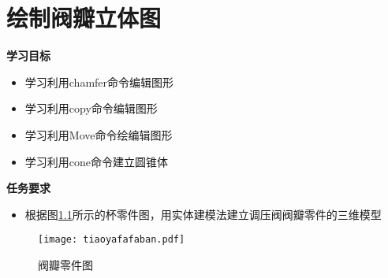 \chapter{绘制阀瓣立体图}

{\bfseries 学习目标}
\begin{itemize}
\item 学习利用chamfer命令编辑图形
\item 学习利用copy命令编辑图形
\item 学习利用Move命令绘编辑图形
\item 学习利用cone命令建立圆锥体
\end{itemize}

{\bfseries 任务要求}
\begin{itemize}
\item 根据图\ref{fig:tiaoyafafaban}所示的杯零件图，用实体建模法建立调压阀阀瓣零件的三维模型
\end{itemize}

\noindent
\begin{figure}[htbp]
\centering
\texttt{[image: tiaoyafafaban.pdf]}
\caption{阀瓣零件图}\label{fig:tiaoyafafaban}
\end{figure}
\endinput